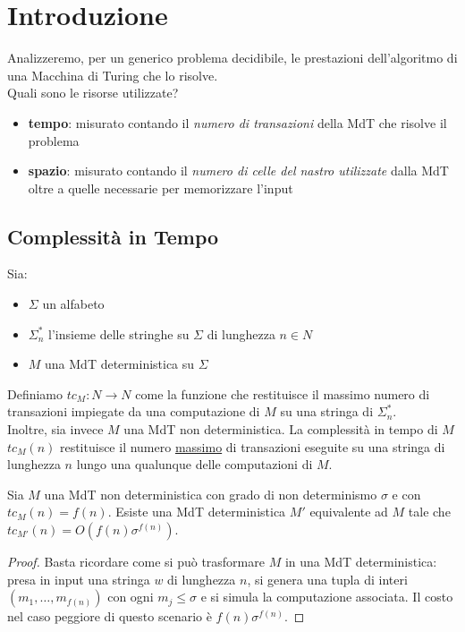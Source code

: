 \section{Introduzione}

Analizzeremo, per un generico problema decidibile, le prestazioni dell'algoritmo di una Macchina di Turing che lo risolve. \\

Quali sono le risorse utilizzate?

\begin{itemize}
	\item \textbf{tempo}: misurato contando il \textit{numero di transazioni} della MdT che risolve il problema
	\item \textbf{spazio}: misurato contando il \textit{numero di celle del nastro utilizzate} dalla MdT oltre a quelle necessarie per memorizzare l'input
\end{itemize}

\subsection{Complessità in Tempo}

Sia:
\begin{itemize}
	\item $\Sigma$ un alfabeto
	\item $\Sigma_n^\ast$ l'insieme delle stringhe su $\Sigma$ di lunghezza $n \in N$
	\item $M$ una MdT deterministica su $\Sigma$
\end{itemize}

Definiamo $tc_M : N \rightarrow N$ come la funzione che restituisce il massimo numero di transazioni impiegate da una computazione di $M$ su una stringa di $\Sigma_n^\ast$. \\

Inoltre, sia invece $M$ una MdT non deterministica. La complessità in tempo di $M$ $tc_M(n)$ restituisce il numero \underline{massimo} di transazioni eseguite su una stringa di lunghezza $n$ lungo una qualunque delle computazioni di $M$.

\begin{lemm}
	Sia $M$ una MdT non deterministica con grado di non determinismo $\sigma$ e con $tc_M(n) = f(n)$. Esiste una MdT deterministica $M'$ equivalente ad $M$ tale che $tc_{M'}(n) = O(f(n)\sigma^{f(n)})$.
\end{lemm}

\begin{proof}
	Basta ricordare come si può trasformare $M$ in una MdT deterministica: presa in input una stringa $w$ di lunghezza $n$, si genera una tupla di interi $(m_1, \ldots, m_{f(n)})$ con ogni $m_j \leq \sigma$ e si simula la computazione associata. Il costo nel caso peggiore di questo scenario è $f(n)\sigma^{f(n)}$.
\end{proof}
